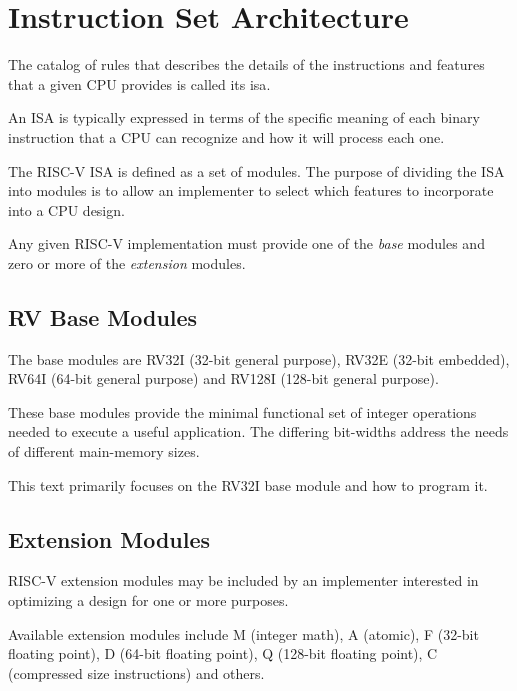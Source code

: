 \section{Instruction Set Architecture}

The catalog of rules that describes the details of the instructions 
and features that a given CPU provides is called its \acrfull{isa}.

An ISA is typically expressed in terms of the specific meaning of
each binary instruction that a CPU can recognize and how it will
process each one.

The RISC-V ISA is defined as a set of modules.  The purpose of
dividing the ISA into modules is to allow an implementer to select which 
features to incorporate into a CPU design.

Any given RISC-V implementation must provide one of the {\em base}
modules and zero or more of the {\em extension} modules.

\subsection{RV Base Modules}

The base modules are RV32I (32-bit general purpose), 
RV32E (32-bit embedded), RV64I (64-bit general purpose) 
and RV128I (128-bit general purpose).

These base modules provide the minimal functional set of integer operations
needed to execute a useful application.  The differing bit-widths address
the needs of different main-memory sizes.

This text primarily focuses on the RV32I base module and how to program it.


\subsection{Extension Modules}

RISC-V extension modules may be included by an implementer interested
in optimizing a design for one or more purposes.

%
%
%
%
%
%
Available extension modules include M (integer math), A (atomic),
F (32-bit floating point), D (64-bit floating point), 
Q (128-bit floating point), C (compressed size instructions) and others.

